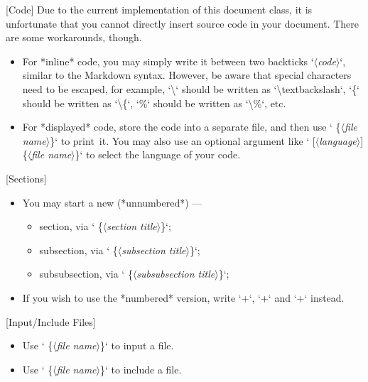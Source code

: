 \documentclass[%
  use style = classical,
  scroll,
]{Q-and-A}
\newcommand{\meta}[1]{$\langle${\normalfont\itshape#1}$\rangle$}
\begin{document}
  [Code]
  Due to the current implementation of this document class, it is unfortunate that you cannot directly insert source code in your document. There are some workarounds, though.
  \begin{itemize}
    \item For *inline* code, you may simply write it between two backticks `\textbacktick\meta{code}\textbacktick`, similar to the Markdown syntax. However, be aware that special characters need to be escaped, for example, `\textbackslash` should be written as `\textbackslash textbackslash`, `\{` should be written as `\textbackslash\{`, `\%` should be written as `\textbackslash\%`, etc.
    \item For *displayed* code, store the code into a separate file, and then use `\textequalsign\textequalsign{} \{\meta{file name}\}` to print~it. You may also use an optional argument like `\textequalsign\textequalsign{} [\meta{language}] \{\meta{file name}\}` to select the language of your code.
  \end{itemize}

  [Sections]
  \begin{itemize}
    \item You may start a new (*unnumbered*) ---
    \begin{itemize}
      \item section, via `\textsharp\textsharp{} \{\meta{section title}\}`;
      \item subsection, via `\textsharp\textsharp\textsharp{} \{\meta{subsection title}\}`;
      \item subsubsection, via `\textsharp\textsharp\textsharp\textsharp{} \{\meta{subsubsection title}\}`;
    \end{itemize}
    \item If you wish to use the *numbered* version, write `\textsharp\textsharp+`, `\textsharp\textsharp\textsharp+` and `\textsharp\textsharp\textsharp\textsharp+` instead.
  \end{itemize}

  [Input/Include Files]
  \begin{itemize}
    \item Use `\textcolon\textcolon{} \{\meta{file name}\}` to input a file.
    \item Use `\textcolon\textcolon\textcolon{} \{\meta{file name}\}` to include a file.
  \end{itemize}
\end{document}
